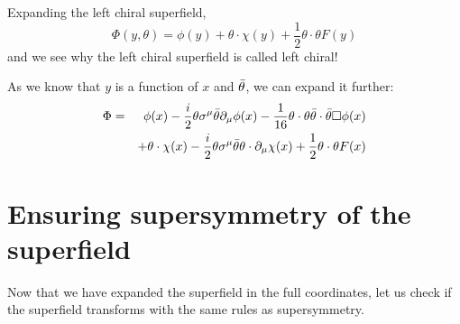 Expanding the left chiral superfield,
\begin{equation}
    \Phi(y, \theta) = \phi(y) + \theta \cdot \chi(y) + \frac{1}{2} \theta\cdot\theta F(y)
    \label{eqn:12:y expanded general left chiral superfield}
\end{equation}
and we see why the left chiral superfield is called left chiral!

As we know that $y$ is a function of $x$ and $\Bar{\theta}$, we can expand it further:
\begin{eqnarray}
    \Phi &=& \phi(x) - \frac{i}{2} \theta \sigma^\mu \Bar{\theta} \partial_\mu \phi(x) - \frac{1}{16} \theta \cdot \theta \Bar{\theta} \cdot \Bar{\theta} \Box \phi(x) \nonext
    && + \theta \cdot \chi(x) - \frac{i}{2} \theta \sigma^\mu \Bar{\theta} \theta \cdot \partial_\mu \chi(x) + \frac{1}{2} \theta \cdot \theta F(x)
    \label{eqn:12:expanded general left chiral superfield}
\end{eqnarray}

\section{Ensuring supersymmetry of the superfield}
\label{ch:12:ensuring supersymmetry of the superfield}
Now that we have expanded the superfield in the full coordinates, let us check if the superfield transforms with the same rules as supersymmetry. 

